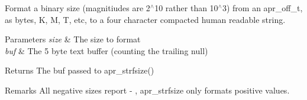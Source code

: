 Format a binary size (magnitiudes are 2$^\wedge$10 rather than 10$^\wedge$3) from an apr\+\_\+off\+\_\+t, as bytes, K, M, T, etc, to a four character compacted human readable string. 
\begin{DoxyParams}{Parameters}
{\em size} & The size to format \\
\hline
{\em buf} & The 5 byte text buffer (counting the trailing null) \\
\hline
\end{DoxyParams}
\begin{DoxyReturn}{Returns}
The buf passed to apr\+\_\+strfsize() 
\end{DoxyReturn}
\begin{DoxyRemark}{Remarks}
All negative sizes report \textquotesingle{} -\/ \textquotesingle{}, apr\+\_\+strfsize only formats positive values. 
\end{DoxyRemark}
